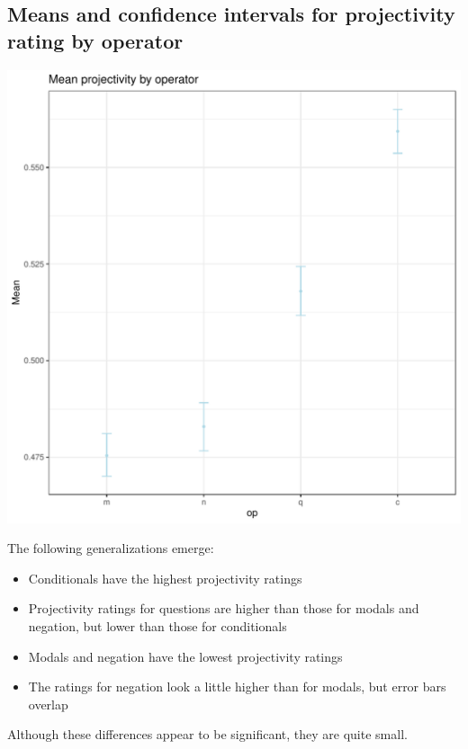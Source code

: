 \documentclass[10pt]{article}\usepackage[]{graphicx}\usepackage[]{color}
\newenvironment{knitrout}{}{} %
\begin{document}
\subsection{Means and confidence intervals for projectivity rating by operator}
\begin{knitrout}
\color{fgcolor}

{\centering \includegraphics[width=.6\textwidth]{figures/figuressummary-op-1} 

}


\end{knitrout}

\noindent The following generalizations emerge:
\begin{itemize}
  \item Conditionals have the highest projectivity ratings
  \item Projectivity ratings for questions are higher than those for modals and negation, but lower than those for conditionals
  \item Modals and negation have the lowest projectivity ratings
  \item The ratings for negation look a little higher than for modals, but error bars overlap
\end{itemize}

\noindent Although these differences appear to be significant, they are quite small.\\

\newpage
\end{document}
